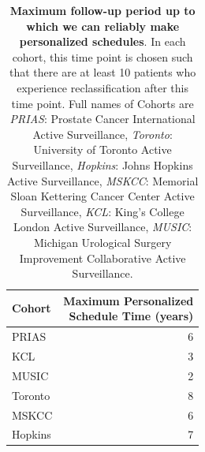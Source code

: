 \begin{table}[!htb]
\small\sf\centering
\caption{\textbf{Maximum follow-up period up to which we can reliably make personalized schedules}. In each cohort, this time point is chosen such that there are at least 10 patients who experience reclassification after this time point. Full names of Cohorts are \textit{PRIAS}: Prostate Cancer International Active Surveillance, \textit{Toronto}: University of Toronto Active Surveillance, \textit{Hopkins}: Johns Hopkins Active Surveillance, \textit{MSKCC}: Memorial Sloan Kettering Cancer Center Active Surveillance, \textit{KCL}: King's College London Active Surveillance, \textit{MUSIC}: Michigan Urological Surgery Improvement Collaborative Active Surveillance.}
\label{tab:max_pred_time_repeat}
\begin{tabular}{l|r}
\hline
\hline
Cohort & \parbox[t]{3.75cm}{Maximum Personalized\\Schedule Time (years)}\\
\hline
PRIAS & 6\\
KCL & 3\\
MUSIC & 2\\
Toronto & 8\\
MSKCC & 6\\
Hopkins & 7\\
\hline
\end{tabular}	
\end{table}

